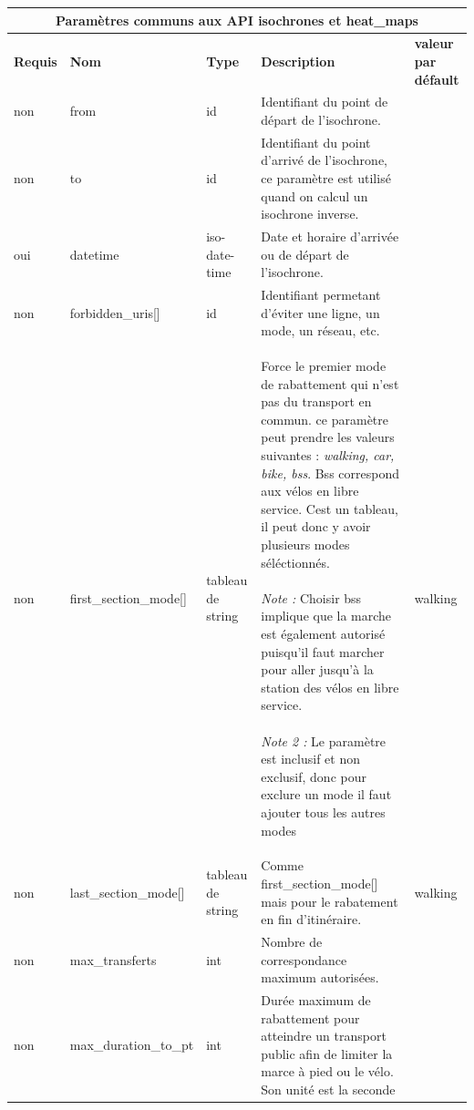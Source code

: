 \documentclass[a4paper]{report}
\begin{document}
\begin{center}
	\begin{tabular}{|l|l|p{1.5cm}|p{6cm}|l|}
	\hline
	\multicolumn{5}{|c|}{\cellcolor{LightCyan} \textbf{Paramètres communs aux API isochrones et heat\_maps}} \\
	\hline
	\textbf{Requis} & \textbf{Nom} & \textbf{Type} & \textbf{Description} &  \textbf{valeur par défault} \\
	\hline
	non & from & id & Identifiant du point de départ de l'isochrone. &\\
	\hline
	non & to & id & Identifiant du point d'arrivé de l'isochrone, ce paramètre est utilisé quand on calcul un isochrone inverse. &\\
	\hline
	oui & datetime & iso-date-time & Date et horaire d'arrivée ou de départ de l'isochrone. & \\
	\hline
	non & forbidden\_uris[] & id & Identifiant permetant d'éviter une ligne, un mode, un réseau, etc. & \\
	\hline
	non & first\_section\_mode[] & tableau de string & Force le premier mode de rabattement qui n'est pas du transport en commun.  ce paramètre peut prendre les valeurs suivantes : \emph{walking, car, bike, bss}. Bss correspond aux vélos en libre service. Cest un tableau, il peut donc y avoir plusieurs modes séléctionnés.
	\paragraph{}\emph{Note :} Choisir bss implique que la marche est également autorisé puisqu'il faut marcher pour aller jusqu'à la station des vélos en libre service.
	\paragraph{}\emph{Note 2 :} Le paramètre est inclusif et non exclusif, donc pour exclure un mode il faut ajouter tous les autres modes & walking \\ 
	\hline
	non & last\_section\_mode[] & tableau de string & Comme first\_section\_mode[] mais pour le rabatement en fin d'itinéraire. & walking \\ 
	\hline
	non & max\_transferts & int & Nombre de correspondance maximum autorisées. & \\
	\hline
	non & max\_duration\_to\_pt & int & Durée maximum de rabattement pour atteindre un transport public afin de limiter la marce à pied ou le vélo. Son unité est la seconde

\end{tabular}
\end{center}
\end{document}
